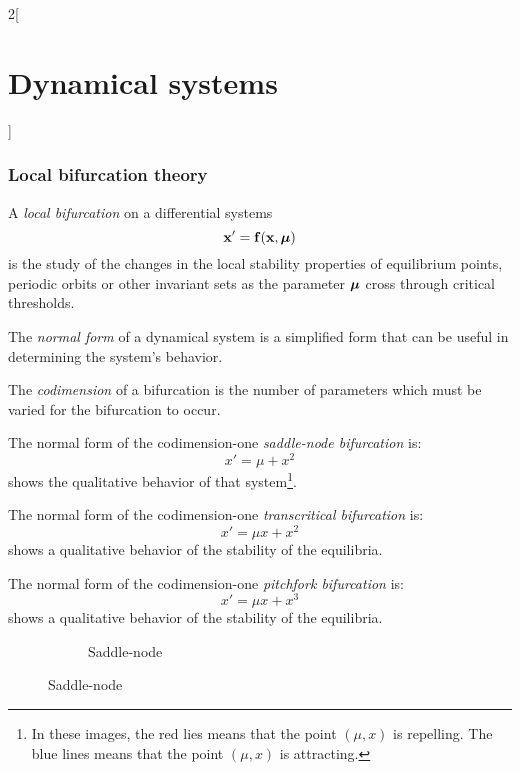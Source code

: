 \documentclass[../../../main_math.tex]{subfiles}
\begin{document}
\begin{multicols}{2}[\section{Dynamical systems}]
  \subsubsection{Local bifurcation theory}
  \begin{definition}
    A \emph{local bifurcation} on a differential systems
    \begin{equation}\label{DS:mu-system}
      \boldsymbol{\mathrm{x}}'=\boldsymbol{\mathrm{f}}(\boldsymbol{\mathrm{x}},\boldsymbol{\mathrm{\mu}})
    \end{equation}
    is the study of the changes in the local stability properties of equilibrium points, periodic orbits or other invariant sets as the parameter $\boldsymbol{\mathrm{\mu}}$ cross through critical thresholds.
  \end{definition}
  \begin{definition}
    The \emph{normal form} of a dynamical system is a simplified form that can be useful in determining the system's behavior.
  \end{definition}
  \begin{definition}
    The \emph{codimension} of a bifurcation is the number of parameters which must be varied for the bifurcation to occur.
  \end{definition}
  \begin{definition}
    The normal form of the codimension-one \emph{saddle-node bifurcation} is: $$x'=\mu+x^2$$
     shows the qualitative behavior of that system\footnote{In these images, the red lies means that the point $(\mu,x)$ is repelling. The blue lines means that the point $(\mu,x)$ is attracting.}.
  \end{definition}
  \begin{definition}
    The normal form of the codimension-one \emph{transcritical bifurcation} is: $$x'=\mu x+x^2$$
     shows a qualitative behavior of the stability of the equilibria.
  \end{definition}
  \begin{definition}
    The normal form of the codimension-one \emph{pitchfork bifurcation} is: $$x'=\mu x+x^3$$
     shows a qualitative behavior of the stability of the equilibria.
  \end{definition}
  \begin{figure}[H]
    \centering
    \begin{subfigure}[b]{0.32\linewidth}
      \centering
      
      \caption{Saddle-node}

\end{subfigure}
\end{figure}
\end{multicols}
\end{document}

